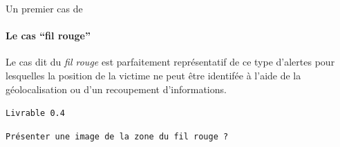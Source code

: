 Un premier cas de 


\paragraph{Le cas \enquote{fil rouge}}

Le cas dit du \emph{fil rouge} est parfaitement représentatif de ce
type d'alertes pour lesquelles la position de la victime ne peut être
identifée à l'aide de la géolocalisation ou d'un recoupement
d'informations.

\texttt{Livrable 0.4}

\texttt{Présenter une image de la zone du fil rouge ?}

